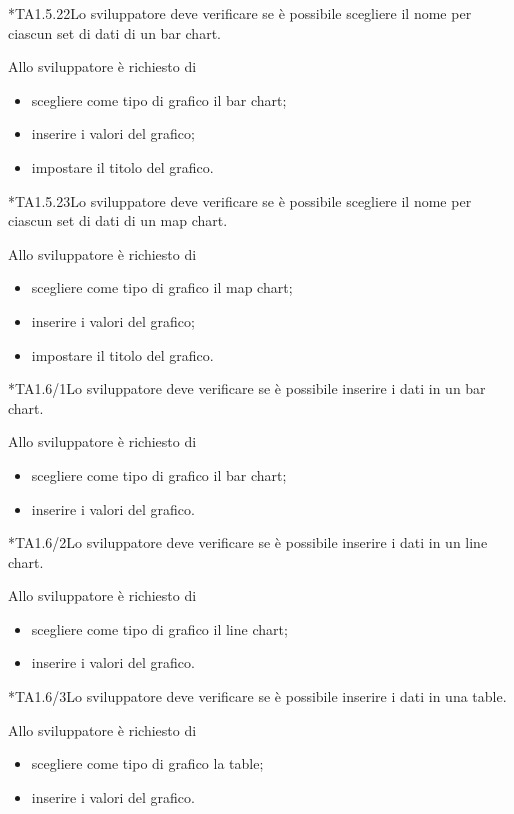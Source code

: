 	*{TA1.5.22}Lo sviluppatore deve verificare se è possibile scegliere il nome per ciascun set di dati di un bar chart.

		Allo sviluppatore è richiesto di
		\begin{itemize}
			\item scegliere come tipo di grafico il bar chart;
			\item inserire i valori del grafico;
			\item impostare il titolo del grafico.
		\end{itemize}

	*{TA1.5.23}Lo sviluppatore deve verificare se è possibile scegliere il nome per ciascun set di dati di un map chart.

		Allo sviluppatore è richiesto di
		\begin{itemize}
			\item scegliere come tipo di grafico il map chart;
			\item inserire i valori del grafico;
			\item impostare il titolo del grafico.
		\end{itemize}

	*{TA1.6/1}Lo sviluppatore deve verificare se è possibile inserire i dati in un bar chart.

		Allo sviluppatore è richiesto di
		\begin{itemize}
			\item scegliere come tipo di grafico il bar chart;
			\item inserire i valori del grafico.
		\end{itemize}	
			
	*{TA1.6/2}Lo sviluppatore deve verificare se è possibile inserire i dati in un line chart.

		Allo sviluppatore è richiesto di
		\begin{itemize}
			\item scegliere come tipo di grafico il line chart;
			\item inserire i valori del grafico.
		\end{itemize}	

	*{TA1.6/3}Lo sviluppatore deve verificare se è possibile inserire i dati in una table.

		Allo sviluppatore è richiesto di
		\begin{itemize}
			\item scegliere come tipo di grafico la table;
			\item inserire i valori del grafico.
		\end{itemize}	

